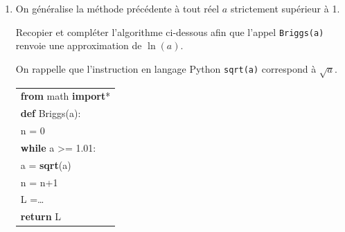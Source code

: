 \documentclass[10pt]{article}
\begin{document}
\begin{enumerate}
On décide de prendre $x - 1$ comme approximation de $\ln (x)$ lorsque $x$ appartient à l'intervalle $]0,99~;~1,01[$.

	\begin{enumerate}
		\item Déterminer à l'aide de la calculatrice le plus petit entier naturel $k$ tel que $u_{k}$ appartienne à l'intervalle $]0,99 ~;~1,01[$ et donner une valeur approchée de $u_{k}$ à $10^{-5}$ près.
		\item En déduire une approximation de $\ln \left(u_{k}\right)$.
\item Déduire des questions \textbf{1. c.} et \textbf{2. b.} de la \textbf{partie B} une approximation de $\ln (2)$.
	\end{enumerate}

\item On généralise la méthode précédente à tout réel $a$ strictement supérieur à 1.

Recopier et compléter l'algorithme ci-dessous afin que l'appel \texttt{Briggs(a)} renvoie une approximation de $\ln (a)$.

On rappelle que l'instruction en langage Python \texttt{sqrt(a)} correspond à $\sqrt{a}$.

\begin{center}
\begin{ttfamily}
\begin{tabularx}{8cm}{|X|}\hline
\textbf{from} math \textbf{import}*\\
\textbf{def} Briggs(a):\\
\quad n = 0\\
\quad \textbf{while} a >= 1.01:\\
	\quad \quad a = \textbf{sqrt}(a)\\
	\quad \quad n = n+1\\
	\quad L =\dots\\
	\textbf{return} L\\ \hline
	\end{tabularx}
	\end{ttfamily}
\end{center}
\end{enumerate}



\bigskip
\end{document}

